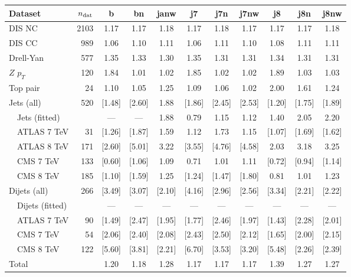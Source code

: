 \begin{tabularx}{\textwidth}{Xrccccccccc}
    \toprule
     Dataset                    & $n_{\rm dat}$ &     b  &   bn   &  janw  &    j7  &   j7n  &  j7nw  &    j8  &   j8n  &  j8nw  \\
    \midrule
     DIS NC                     &       2103  &  1.17  &  1.17  &  1.18  &  1.17  &  1.18  &  1.17  &  1.17  &  1.17  &  1.18  \\
     DIS CC                     &        989  &  1.06  &  1.10  &  1.11  &  1.06  &  1.11  &  1.10  &  1.08  &  1.11  &  1.11  \\
     Drell-Yan                  &        577  &  1.35  &  1.33  &  1.30  &  1.35  &  1.31  &  1.31  &  1.34  &  1.31  &  1.31  \\
     $Z$ $p_T$                  &        120  &  1.84  &  1.01  &  1.02  &  1.85  &  1.02  &  1.02  &  1.89  &  1.03  &  1.03  \\
     Top pair                   &         24  &  1.10  &  1.05  &  1.25  &  1.09  &  1.06  &  1.02  &  2.00  &  1.61  &  1.24  \\
     Jets (all)                 &        520  & [1.48] & [2.60] &  1.88  & [1.86] & [2.45] & [2.53] & [1.20] & [1.75] & [1.89] \\
     \ \ Jets (fitted)          &             &  ---   &  ---   &  1.88  &  0.79  &  1.15  &  1.12  &  1.40  &  2.05  &  2.20  \\
     \ \ ATLAS 7 TeV            &         31  & [1.26] & [1.87] &  1.59  &  1.12  &  1.73  &  1.15  & [1.07] & [1.69] & [1.62] \\
     \ \ ATLAS 8 TeV            &        171  & [2.60] & [5.01] &  3.22  & [3.55] & [4.76] & [4.58] &  2.03  &  3.18  &  3.25  \\
     \ \ CMS   7 TeV            &        133  & [0.60] & [1.06] &  1.09  &  0.71  &  1.01  &  1.11  & [0.72] & [0.94] & [1.14] \\
     \ \ CMS   8 TeV            &        185  & [1.10] & [1.59] &  1.25  & [1.24] & [1.47] & [1.80] &  0.81  &  1.01  &  1.23  \\
     Dijets (all)               &        266  & [3.49] & [3.07] & [2.10] & [4.16] & [2.96] & [2.56] & [3.34] & [2.21] & [2.22] \\
     \ \ Dijets (fitted)        &             &  ---   &  ---   &  ---   &  ---   &  ---   &  ---   &   ---  &  ---   &  ---   \\
     \ \ ATLAS 7 TeV            &         90  & [1.49] & [2.47] & [1.95] & [1.77] & [2.46] & [1.97] & [1.43] & [2.28] & [2.01] \\
     \ \ CMS   7 TeV            &         54  & [2.06] & [2.40] & [2.08] & [2.43] & [2.50] & [2.12] & [1.65] & [2.00] & [2.15] \\
     \ \ CMS   8 TeV            &        122  & [5.60] & [3.81] & [2.21] & [6.70] & [3.53] & [3.20] & [5.48] & [2.26] & [2.39] \\
    \midrule
     Total                      &             &  1.20  & 1.18   &  1.28  &  1.17  &  1.17  & 1.17  &   1.39  &  1.27  &  1.27  \\
    \bottomrule
    \end{tabularx}

